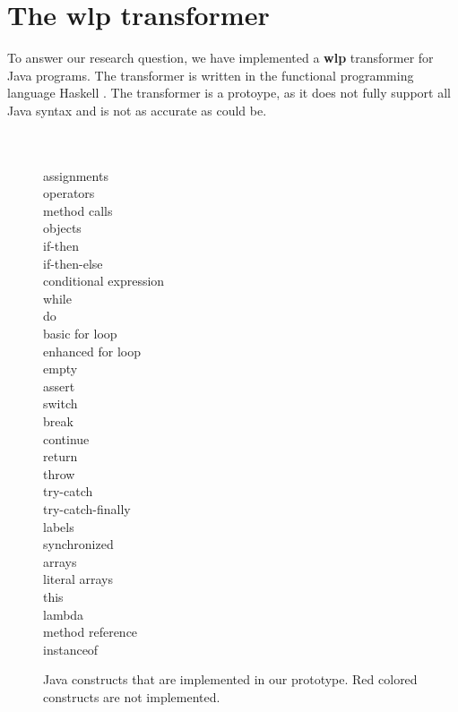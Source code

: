 \documentclass[a4paper, fleqn]{article}
\newcommand{\wlp}{\textbf{wlp}\xspace}
\begin{document}
\section{The wlp transformer}
To answer our research question, we have implemented a \wlp transformer for Java programs. The transformer is written in the functional programming language Haskell \cite{haskell}. The transformer is a protoype, as it does not fully support all Java syntax and is not as accurate as could be.
\\\\\\
\begin{wrapfigure}{r}{3.5cm}
assignments\\
operators\\
method calls\\
objects\\
if-then \\
if-then-else \\
conditional expression\\
while\\
do\\
basic for loop\\
\color{red}enhanced for loop\color{black} \\
empty\\
assert\\
switch\\
break\\
continue\\
return\\
throw\\
try-catch\\
try-catch-finally\\
\color{red}labels\color{black} \\
\color{red}synchronized\color{black} \\
arrays\\
\color{red}literal arrays\color{black} \\
this\\
\color{red}lambda\color{black} \\
\color{red}method reference\color{black} \\
\color{red}instanceof\color{black} \\


\caption{Java constructs that are implemented in our prototype. Red colored constructs are not implemented.}
\label{supported constructs}
\end{wrapfigure}
\vspace{0cm}
\end{document}
